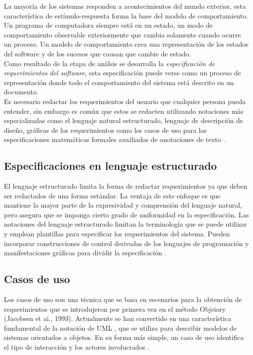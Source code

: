 La mayoría de los sistemas responden a acontecimientos del mundo exterior, esta característica de estímulo-respuesta 
forma la base del modelo de comportamiento. Un programa de computadora siempre está en un estado, un modo de comportamiento observable
exteriormente que cambia solamente cuando ocurre un proceso. Un modelo de comportamiento crea una representación de los estados del
software y de los sucesos que causan que cambie de estado.\\

Como resultado de la etapa de análsis se desarrolla la \emph{especificación de requerimientos del software}, 
esta especificación puede verse como un proceso de representación donde todo el comportamiento del sistema está descrito en un documento.\\

Es necesario redactar los requerimientos del usuario que cualquier persona pueda entender, sin embargo es común que estos se redacten utilizando notaciones
más especializadas como el lenguaje natural estructurado, lenguaje de descripción de diseño, 
gráficas de los requerimientos como los casos de uso para las especificaciones matemáticas formales auxiliados de anotaciones de texto \cite{sommerville1992software}. 

\subsection{Especificaciones en lenguaje estructurado}
El lenguaje estructurado limita la forma de redactar requerimientos ya que deben ser redactados de una forma estándar. La ventaja de este enfoque es que
mantiene la mayor parte de la expresividad y comprensión del lenguaje natural, pero asegura
que se imponga cierto grado de uniformidad en la especificación. Las notaciones del lenguaje 
estructurado limitan la terminología que se puede utilizar y emplean plantillas para
especificar los requerimientos del sistema. Pueden incorporar construcciones de control
derivadas de los lenguajes de programación y manifestaciones gráficas para dividir la especificación \cite{sommerville1992software}.\\

\subsection{Casos de uso}
Los casos de uso son una técnica que se basa en escenarios para la obtención de requerimientos que se introdujeron 
por primera vez en el método Objeiory (Jacobsen et ai., 1993).
Actualmente se han convertido en una característica fundamental de la notación de UML , que
se utiliza para describir modelos de sistemas orientados a objetos. En su forma más simple,
un caso de uso identifica el tipo de interacción y los actores involucrados \cite{sommerville1992software}.\\

